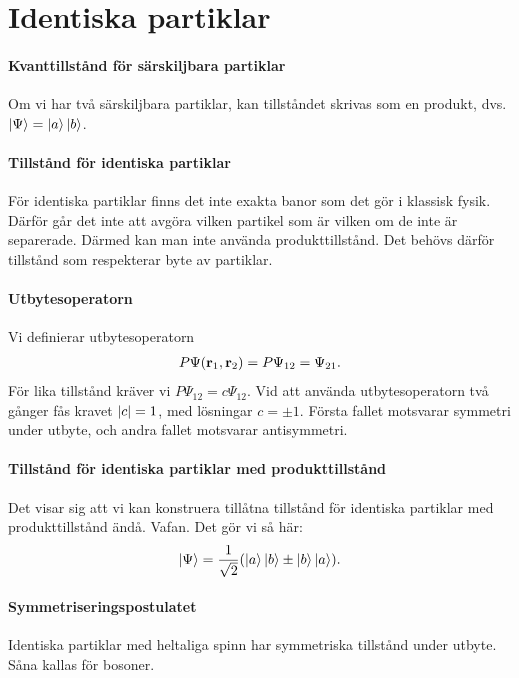 \section{Identiska partiklar}

\paragraph{Kvanttillstånd för särskiljbara partiklar}
Om vi har två särskiljbara partiklar, kan tillståndet skrivas som en produkt, dvs. $\ket{\Psi} = \ket{a}\ket{b}$.

\paragraph{Tillstånd för identiska partiklar}
För identiska partiklar finns det inte exakta banor som det gör i klassisk fysik. Därför går det inte att avgöra vilken partikel som är vilken om de inte är separerade. Därmed kan man inte använda produkttillstånd. Det behövs därför tillstånd som respekterar byte av partiklar.

\paragraph{Utbytesoperatorn}
Vi definierar utbytesoperatorn
\begin{align*}
	P\Psi(\vb{r}_{1}, \vb{r}_{2}) = P\Psi_{12} = \Psi_{21}.
\end{align*}
För lika tillstånd kräver vi $P\Psi_{12} = c\Psi_{12}$. Vid att använda utbytesoperatorn två gånger fås kravet $\abs{c} = 1$, med lösningar $c = \pm 1$. Första fallet motsvarar symmetri under utbyte, och andra fallet motsvarar antisymmetri.

\paragraph{Tillstånd för identiska partiklar med produkttillstånd}
Det visar sig att vi kan konstruera tillåtna tillstånd för identiska partiklar med produkttillstånd ändå. Vafan. Det gör vi så här:
\begin{align*}
	\ket{\Psi} = \frac{1}{\sqrt{2}}(\ket{a}\ket{b} \pm \ket{b}\ket{a}).
\end{align*}

\paragraph{Symmetriseringspostulatet}
Identiska partiklar med heltaliga spinn har symmetriska tillstånd under utbyte. Såna kallas för bosoner.

